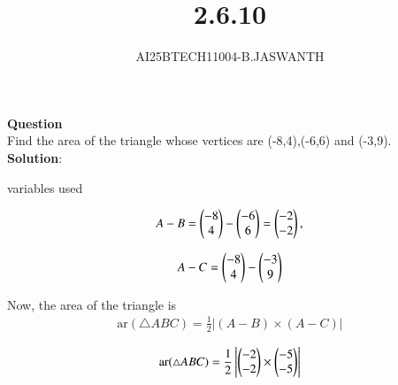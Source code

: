 \documentclass[journal]{IEEEtran}
\begin{document}

\vspace{3cm}


\renewcommand{\thetable}{\theenumi}




\vspace{3cm}


\title{2.6.10}
\author{AI25BTECH11004-B.JASWANTH}
{\let\newpage\relax\maketitle}


\renewcommand{\thefigure}{\theenumi}
\renewcommand{\thetable}{\theenumi}
\setlength{\intextsep}{10pt} %

\textbf{Question}\\
Find the area of the triangle whose vertices are (-8,4),(-6,6) and (-3,9).\\
\textbf{Solution}:\\ 


\begin{table}[h!]
	\centering
	
	\caption{variables used}
	\label{}
\end{table}
\begin{align}
A-B = \begin{pmatrix}-8 \\ 4\end{pmatrix} - \begin{pmatrix}-6 \\ 6\end{pmatrix} 
= \begin{pmatrix}-2 \\ -2\end{pmatrix},
\end{align}

\begin{align}
A-C = \begin{pmatrix}-8 \\ 4\end{pmatrix} - \begin{pmatrix}-3 \\ 9\end{pmatrix} 
 \end{align}




Now, the area of the triangle is
\begin{align}
 \text{ar}(\triangle ABC) 
= \frac{1}{2} \left| (A-B) \times (A-C) \right|   
\end{align}

\begin{align}
 \text{ar}(\triangle ABC)=  \frac{1}{2} \left| \begin{pmatrix}-2 \\ -2\end{pmatrix} \times  \begin{pmatrix}-5 \\ -5\end{pmatrix} \right |
\end{align}
\end{document}
